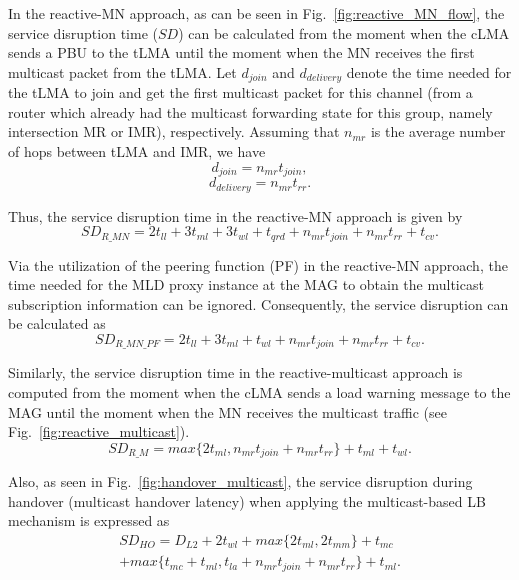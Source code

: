 In the reactive-MN approach, as can be seen in Fig.~\ref{fig:reactive_MN_flow}, the service disruption time ($SD$) can be calculated from the moment when the cLMA sends a PBU to the tLMA until the moment when the MN receives the first multicast packet from the tLMA. Let $d_{join}$ and $d_{delivery}$ denote the time needed for the tLMA to join and get the first multicast packet for this channel (from a router which already had the multicast forwarding state for this group, namely intersection MR or IMR), respectively. Assuming that $n_{mr}$ is the average number of hops between tLMA and IMR, we have 
\begin{equation}
d_{join} = n_{mr} t_{join},
\end{equation}
\begin{equation}
d_{delivery} = n_{mr} t_{rr}.
\end{equation}

Thus, the service disruption time in the reactive-MN approach is given by\\
\begin{equation}
SD_{R\_MN} = 2t_{ll} + 3t_{ml} + 3t_{wl} + t_{qrd} + n_{mr} t_{join} + n_{mr} t_{rr} + t_{cv}. 
\label{eq:r_mn}
\end{equation}

Via the utilization of the peering function (PF) in the reactive-MN approach, the time needed for the MLD proxy instance at the MAG to obtain the multicast subscription information can be ignored. Consequently, the service disruption can be calculated as\\
\begin{equation}
SD_{R\_MN\_PF} = 2t_{ll} + 3t_{ml} + t_{wl}  + n_{mr} t_{join} + n_{mr} t_{rr} + t_{cv}.
\label{eq:r_mn_pf}
\end{equation}

Similarly, the service disruption time in the reactive-multicast approach is computed from the moment when the cLMA sends a load warning message to the MAG until the moment when the MN receives the multicast traffic (see Fig.~\ref{fig:reactive_multicast}).\\
\begin{equation}
SD_{R\_M} = max \{2t_{ml}, n_{mr} t_{join} + n_{mr} t_{rr}\} + t_{ml} + t_{wl}.
\label{eq:r_m}
\end{equation}

Also, as seen in Fig.~\ref{fig:handover_multicast}, the service disruption during handover (multicast handover latency) when applying the multicast-based LB mechanism is expressed as\\
\begin{multline}
SD_{HO} = D_{L2} + 2t_{wl} + max \{2t_{ml}, 2t_{mm}\} + t_{mc} \\+max \{t_{mc} +t_{ml}, t_{la} + n_{mr} t_{join} + n_{mr} t_{rr}\} + t_{ml}.
\label{eq:ho}
\end{multline}

